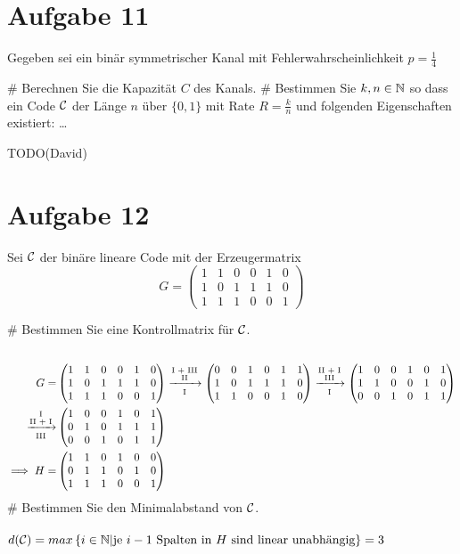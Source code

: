 
\setcounter{MaxMatrixCols}{20}

\section*{Aufgabe 11}
Gegeben sei ein binär symmetrischer Kanal mit Fehlerwahrscheinlichkeit $p = \frac{1}{4}$
\begin{myList}
#
Berechnen Sie die Kapazität $C$ des Kanals.
#
Bestimmen Sie $k,n \in \mathbb{N}$ so dass ein Code $\mathcal{C}$ der Länge $n$ über $\lbrace 0,1 \rbrace$ mit Rate $R = \frac{k}{n}$ und folgenden Eigenschaften existiert: \ldots
\end{myList}
TODO(David)

\section*{Aufgabe 12}
Sei $\mathcal{C}$ der binäre lineare Code mit der Erzeugermatrix
\begin{equation*}
	G = \begin{pmatrix}
		1 & 1 & 0 & 0 & 1 & 0 \\
		1 & 0 & 1 & 1 & 1 & 0 \\
		1 & 1 & 1 & 0 & 0 & 1
	\end{pmatrix}
\end{equation*}
\begin{myList}
#
Bestimmen Sie eine Kontrollmatrix für $\mathcal{C}$.\\\\
\begin{align*}
G=&\begin{pmatrix}
1&1&0&0&1&0\\
1&0&1&1&1&0\\
1&1&1&0&0&1
\end{pmatrix}\lgsto{\rom 1 + \rom 3}{\rom 2}{\rom 1}{}\begin{pmatrix}
0&0&1&0&1&1\\
1&0&1&1&1&0\\
1&1&0&0&1&0
\end{pmatrix}\lgsto{\rom 2 + \rom 1}{\rom 3}{\rom 1}{}\begin{pmatrix}
1&0&0&1&0&1\\
1&1&0&0&1&0\\
0&0&1&0&1&1
\end{pmatrix}\\\lgsto{\rom 1}{\rom 2 + \rom 1}{\rom 3}{}&\begin{pmatrix}
1&0&0&1&0&1\\
0&1&0&1&1&1\\
0&0&1&0&1&1
\end{pmatrix}\\
\implies H=&\begin{pmatrix}
1&1&0&1&0&0\\
0&1&1&0&1&0\\
1&1&1&0&0&1
\end{pmatrix}
\end{align*}
#
Bestimmen Sie den Minimalabstand von $\mathcal{C}$.\\\\
$d(\mathcal{C})=max\left\lbrace i\in\mathbb{N}|\text{je $i-1$ Spalten in $H$ sind linear unabhängig} \right\rbrace=3$
\end{myList}

